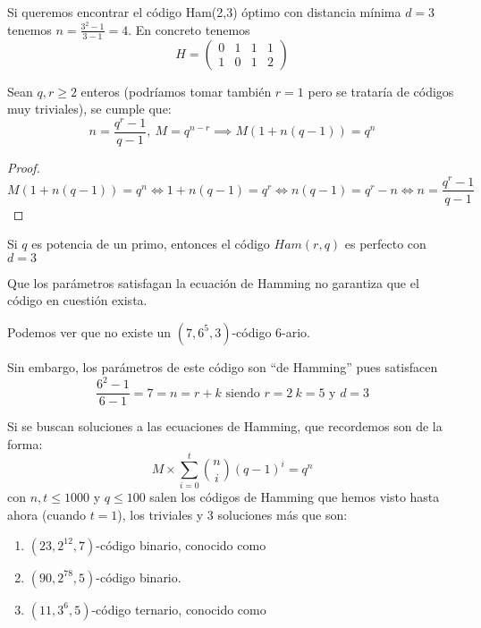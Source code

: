 \begin{example}
Si queremos encontrar el código Ham(2,3) óptimo con distancia mínima $d=3$ tenemos $n=\frac{3^2-1}{3-1}=4$. En concreto tenemos
\[H=\left( \begin{array}{cccc}
0 & 1 & 1 & 1 \\
1 & 0 & 1 & 2
\end{array}\right)\]
\end{example}

\begin{prop}
Sean $q,r \geq 2$ enteros (podríamos tomar también $r=1$ pero se trataría de códigos muy triviales), se cumple que:
\[n = \frac{q^r-1}{q-1}, \ M=q^{n-r} \implies M(1+n(q-1))=q^n\]
\end{prop}
\begin{proof}
\[M(1+n(q-1))=q^n \iff 1+n(q-1) = q^r \iff n(q-1)=q^r-n \iff n=\frac{q^r-1}{q-1}\]
\end{proof}

\begin{corol}
Si $q$ es potencia de un primo, entonces el código $Ham(r,q)$ es perfecto con $d=3$
\end{corol}

\obs Que los parámetros satisfagan la ecuación de Hamming no garantiza que el código en cuestión exista.

\begin{example}
Podemos ver que no existe un $(7,6^5,3)$-código 6-ario.

Sin embargo, los parámetros de este código son ``de Hamming'' pues satisfacen
\[\frac{6^2-1}{6-1}=7=n=r+k \text{ siendo } r=2 \ k=5 \text{ y } d=3\]

\end{example}

Si se buscan soluciones a las ecuaciones de Hamming, que recordemos son de la forma:
\[M \times \sum_{i=0}^t {n \choose i} (q-1)^i=q^n\]
con $n,t \leq 1000$ y $q \leq 100$ salen los códigos de Hamming que hemos visto hasta ahora (cuando $t=1$), los triviales y 3 soluciones más que son:

\begin{enumerate}
\item $(23,2^{12},7)$-código binario, conocido como 
\item $(90,2^{78},5)$-código binario.
\item $(11,3^6,5)$-código ternario, conocido como 
\end{enumerate}

